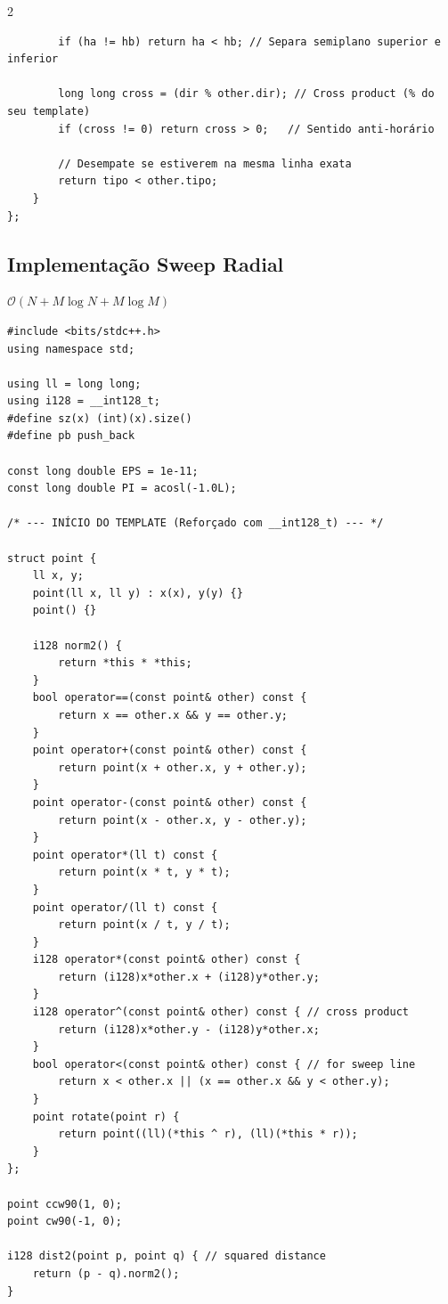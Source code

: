 \documentclass[11pt]{article}
\begin{document}
\begin{multicols}{2}
\begin{lstlisting}
        if (ha != hb) return ha < hb; // Separa semiplano superior e inferior
        
        long long cross = (dir % other.dir); // Cross product (% do seu template)
        if (cross != 0) return cross > 0;   // Sentido anti-horário
        
        // Desempate se estiverem na mesma linha exata
        return tipo < other.tipo; 
    }
};
\end{lstlisting}

\subsection{Implementação Sweep Radial}
$\mathcal{O}(N + M \log N + M \log M)$

\begin{lstlisting}
#include <bits/stdc++.h>
using namespace std;

using ll = long long;
using i128 = __int128_t;
#define sz(x) (int)(x).size()
#define pb push_back

const long double EPS = 1e-11;
const long double PI = acosl(-1.0L);

/* --- INÍCIO DO TEMPLATE (Reforçado com __int128_t) --- */

struct point { 
    ll x, y;
    point(ll x, ll y) : x(x), y(y) {}
    point() {}
        
    i128 norm2() { 
        return *this * *this;
    }
    bool operator==(const point& other) const {
        return x == other.x && y == other.y;
    }
    point operator+(const point& other) const {
        return point(x + other.x, y + other.y);
    }
    point operator-(const point& other) const {
        return point(x - other.x, y - other.y);
    }
    point operator*(ll t) const {
        return point(x * t, y * t);
    }
    point operator/(ll t) const {
        return point(x / t, y / t);
    }
    i128 operator*(const point& other) const {
        return (i128)x*other.x + (i128)y*other.y;
    }
    i128 operator^(const point& other) const { // cross product
        return (i128)x*other.y - (i128)y*other.x;
    }
    bool operator<(const point& other) const { // for sweep line
        return x < other.x || (x == other.x && y < other.y);
    }
    point rotate(point r) {
        return point((ll)(*this ^ r), (ll)(*this * r));
    }
};

point ccw90(1, 0);
point cw90(-1, 0);

i128 dist2(point p, point q) { // squared distance
    return (p - q).norm2();
}


\end{lstlisting}
\end{multicols}
\end{document}
